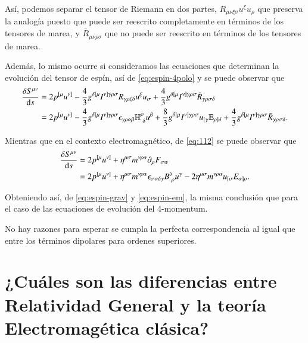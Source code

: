 Así, podemos separar el tensor de Riemann en dos partes, $R_{\mu \nu \xi \sigma} u^{\xi} u_{\rho}$ que preserva la analogía puesto que puede ser reescrito completamente en términos de los tensores de marea, y $\bar{R}_{\mu \nu \rho \sigma}$ que no puede ser reescrito en términos de los tensores de marea.

Además, lo mismo ocurre si consideramos las ecuaciones que determinan la evolución del tensor de espín, así de \eqref{eq:espin-4polo} y se puede observar que
\begin{align}
\cd{S^{\mu \nu}} &= 2p^{[\mu} u^{\nu]} - \frac{4}{3} g^{\delta [ \mu} I^{\nu] \gamma \rho \sigma} R_{\gamma \rho \xi \delta} u^{\xi} u_{\sigma} + \frac{4}{3} g^{\delta [ \mu} I^{\nu] \gamma \rho \sigma} \bar{R}_{\gamma \rho \sigma \delta} \nonumber\\
&= 2p^{[\mu} u^{\nu]} - \frac{4}{3} g^{\delta [ \mu} I^{\nu] \gamma \rho \sigma} \epsilon_{\gamma \rho \alpha \beta} \mathbb{H}^{\rho}_{\ \delta} u^{\beta} + \frac{8}{3} g^{\delta [ \mu} I^{\nu] \gamma \rho \sigma} u_{[\gamma} \mathbb{E}_{\rho] \delta} + \frac{4}{3} g^{\delta [ \mu} I^{\nu] \gamma \rho \sigma} \bar{R}_{\gamma \rho \sigma \delta}. \label{eq:espin-grav}
\end{align}

Mientras que en el contexto electromagnético, de \eqref{eq:112} se puede observar que
\begin{align}
\frac{\delta S^{\mu \nu}}{\mathrm{d}s} &= 2p^{[\mu} u^{\nu]} + \eta^{\mu \sigma} m^{\nu \rho \alpha} \partial_{\rho} F_{\sigma \alpha} \nonumber \\
&=  2p^{[\mu} u^{\nu]} + \eta^{\mu \sigma} m^{\nu \rho \alpha} \epsilon_{\sigma \alpha \delta \gamma} \mathit{B}^{\delta}_{\ \rho} u^{\gamma} - 2\eta^{\mu \sigma} m^{\nu \rho \alpha} u_{[\sigma} \mathit{E}_{\alpha] \rho}. \label{eq:espin-em}
\end{align}

Obteniendo así, de \eqref{eq:espin-grav} y \eqref{eq:espin-em}, la misma conclusión que para el caso de las ecuaciones de evolución del 4-momentum.

No hay razones para esperar se cumpla la perfecta correspondencia al igual que entre los términos dipolares para ordenes superiores.

\section{¿Cuáles son las diferencias entre Relatividad General y la teoría Electromagética clásica?}

